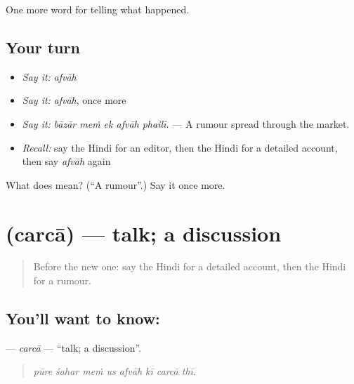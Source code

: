 \begin{grammarlens}[title={What you've built}]
One more word for telling what happened.
\end{grammarlens}

\subsection*{Your turn}
\begin{itemize}
\raggedright
  \item \emph{Say it:} \emph{afvāh}
  \item \emph{Say it:} \emph{afvāh}, once more
  \item \emph{Say it:} \emph{bāzār meṁ ek afvāh phailī.} — A rumour spread through the market.
  \item \emph{Recall:} say the Hindi for an editor, then the Hindi for a detailed account, then say \emph{afvāh} again
\end{itemize}

\begin{tcolorbox}[breakable,colback=teal!4,colframe=teal!35!black,title={Before you move on}]
What does  mean? (\textquotedblleft{}A rumour\textquotedblright{}.) Say it once more.
\end{tcolorbox}
\section[\texorpdfstring{\hi{चर्चा} (carcā)}{चर्चा (carcā)}]{ (carcā) — talk; a discussion}

\label{lesson:HI-C314-carca}



\begin{quote}
Before the new one: say the Hindi for a detailed account, then the Hindi for a rumour.
\end{quote}

\subsection*{You'll want to know: }
\textbf{} — \emph{carcā} — \textquotedblleft{}talk; a discussion\textquotedblright{}.

\begin{quote}
       
\end{quote}

\begin{quote}
\emph{pūre śahar meṁ us afvāh kī carcā thī.}
\end{quote}

